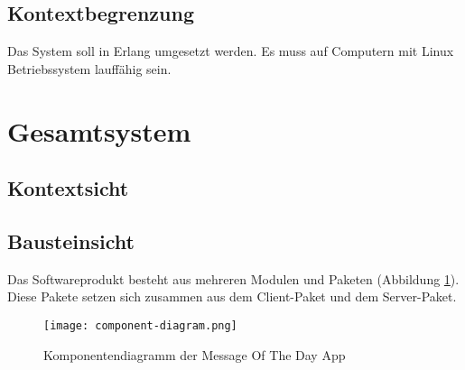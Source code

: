 \documentclass{article}
\begin{document}
\subsection{Kontextbegrenzung}
Das System soll in Erlang umgesetzt werden. Es muss auf Computern mit Linux Betriebssystem lauffähig sein.

\newpage

\section{Gesamtsystem}
\subsection{Kontextsicht}

\subsection{Bausteinsicht}
Das Softwareprodukt besteht aus mehreren Modulen und Paketen (Abbildung \ref{fig:component-diagram}). Diese Pakete setzen sich zusammen aus dem Client-Paket und dem Server-Paket.

\begin{figure}[H]
    \centering
    \texttt{[image: component-diagram.png]}
    \caption[seq-dia]{Komponentendiagramm der Message Of The Day App}
    \label{fig:component-diagram}
\end{figure}
\end{document}
